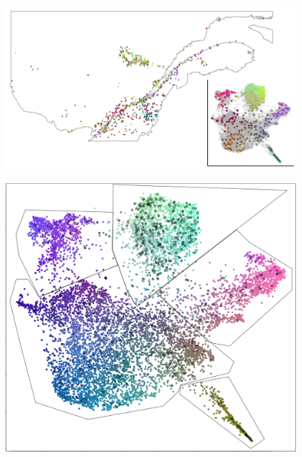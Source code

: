 \documentclass[
11pt, %
oneside, %
english, %
doublespacing, %
headsepline, %
]{MastersDoctoralThesis} %
\begin{document}
\appendix %

\begin{figure}
\includegraphics[width=\hsize,keepaspectratio]{./Figures/Genizon_BalSac_mapsInMaps4.jpg}
\label{UMAP}
\end{figure}

\begin{figure}
\includegraphics[width=\hsize,keepaspectratio]{./Figures/5Clusters.png}
\label{Cluster}
\end{figure}


%



\printbibliography[heading=bibintoc]

\end{document}
